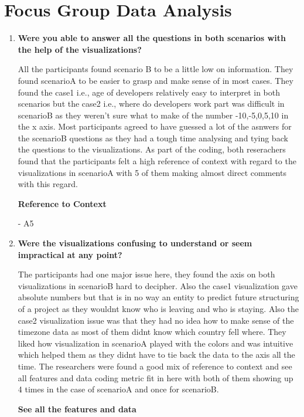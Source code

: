 \documentclass[seploa]{beavtex}
\begin{document}
\section{Focus Group Data Analysis}
\begin{enumerate}
\item \textbf{Were you able to answer all the questions in both scenarios with the help of the visualizations?}

All the participants found scenario B to be a little low on information. They found scenarioA to be easier to grasp and make sense of in most cases. They found the case1 i.e., age of developers relatively easy to interpret in both scenarios but the case2 i.e., where do developers work part was difficult in scenarioB as they weren't sure what to make of the number -10,-5,0,5,10 in the x axis. Most participants agreed to have guessed a lot of the asnwers for the scenarioB questions as they had a tough time analysing and tying back the questions to the visualizations.
As part of the coding, both reserachers found that the participants felt a high reference of context with regard to the visualizations in scenarioA with 5 of them making almost direct comments with this regard.

\textbf{Reference to Context}

{\em {}}- A5

\item \textbf{Were the visualizations confusing to understand or seem impractical at any point?}

The participants had one major issue here, they found the axis on both visualizations in scenarioB hard to decipher. Also the case1 visualization gave absolute numbers but that is in no way an entity to predict future structuring of a project as they wouldnt know who is leaving and who is staying. Also the case2 visualization issue was that they had no idea how to make sense of the timezone data as most of them didnt know which country fell where. They liked how visualization in scenarioA played with the colors and was intuitive which helped them as they didnt have to tie back the data to the axis all the time. The researchers were found a good mix of reference to context and see all features and data coding metric fit in here with both of them showing up 4 times in the case of scenarioA and once for scenarioB.

\textbf{See all the features and data}


\end{enumerate}
\end{document}
